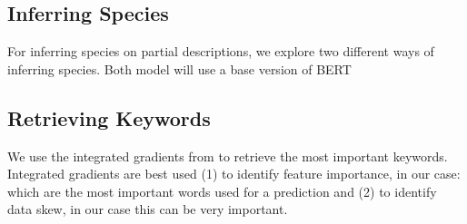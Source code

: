 \documentclass[a4paper, 12pt, oneside]{book} %
\begin{document}
\subsection{Inferring Species}
For inferring species on partial descriptions, we explore two different ways of inferring species.
Both model will use a base version of BERT \autocite{devlin_bert_2019}
\subsection{Retrieving Keywords}
We use the integrated gradients from \textcite{sundararajan_axiomatic_2017} to retrieve the most important keywords.
Integrated gradients are best used (1) to identify feature importance, in our case: which are the most important words used for a prediction and (2) to identify data skew, in our case this can be very important. %
\end{document}
